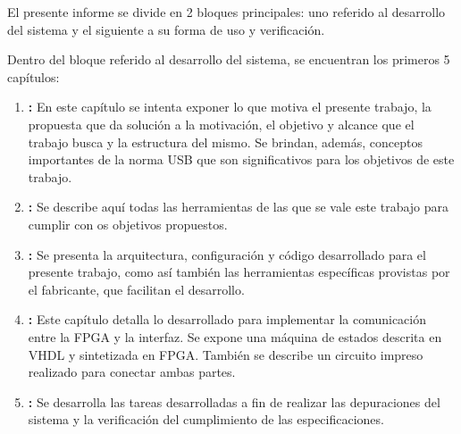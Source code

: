 El presente informe se divide en 2 bloques principales: uno referido al desarrollo del sistema y el siguiente a su forma de uso y verificación.

Dentro del bloque referido al desarrollo del sistema, se encuentran los primeros 5 capítulos:

\begin{enumerate}
	\item {\bf {}:} En este capítulo se intenta exponer lo que motiva el presente trabajo, la propuesta que da solución a la motivación, el objetivo y alcance que el trabajo busca y la estructura del mismo. Se brindan, además, conceptos importantes de la norma USB que son significativos para los objetivos de este trabajo.
	\item {\bf {}:} Se describe aquí todas las herramientas de las que se vale este trabajo para cumplir con os objetivos propuestos.
	\item {\bf {}:} Se presenta la arquitectura, configuración y código desarrollado para el presente trabajo, como así también las herramientas específicas provistas por el fabricante, que facilitan el desarrollo. 
	\item {\bf {}:} Este capítulo detalla lo desarrollado para implementar la comunicación entre la FPGA y la interfaz. Se expone una máquina de estados descrita en VHDL y sintetizada en FPGA. También se describe un circuito impreso realizado para conectar ambas partes.
	\item {\bf {}:} Se desarrolla las tareas desarrolladas a fin de realizar las depuraciones del sistema y la verificación del cumplimiento de las especificaciones.
\end{enumerate}
